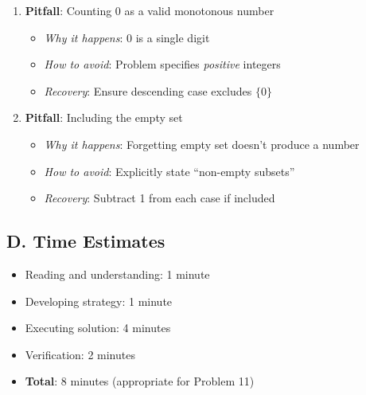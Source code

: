 \documentclass[]{article}
\begin{document}
\begin{solutionbox}
\begin{enumerate}
    \item \textbf{Pitfall}: Counting 0 as a valid monotonous number
    \begin{itemize}
        \item \textit{Why it happens}: 0 is a single digit
        \item \textit{How to avoid}: Problem specifies \emph{positive} integers
        \item \textit{Recovery}: Ensure descending case excludes $\{0\}$
    \end{itemize}
    
    \item \textbf{Pitfall}: Including the empty set
    \begin{itemize}
        \item \textit{Why it happens}: Forgetting empty set doesn't produce a number
        \item \textit{How to avoid}: Explicitly state ``non-empty subsets''
        \item \textit{Recovery}: Subtract 1 from each case if included
    \end{itemize}
\end{enumerate}

\subsection*{D. Time Estimates}
\begin{itemize}[leftmargin=*]
    \item Reading and understanding: 1 minute
    \item Developing strategy: 1 minute
    \item Executing solution: 4 minutes
    \item Verification: 2 minutes
    \item \textbf{Total}: 8 minutes (appropriate for Problem 11)
\end{itemize}
\end{solutionbox}
\end{document}
